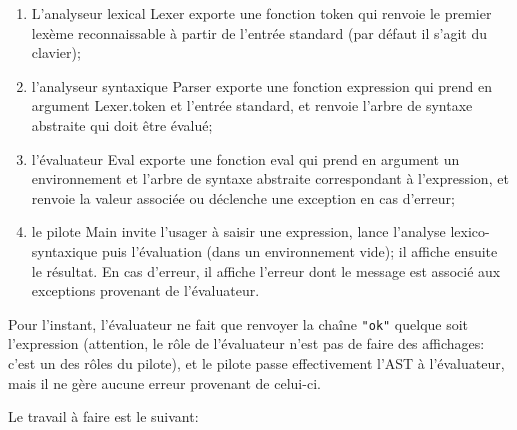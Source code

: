 \documentclass[a4paper,11pt]{article}
\begin{document}
\begin{enumerate}

  \item L'analyseur lexical \textsf{Lexer} exporte une fonction
    \textsf{token} qui renvoie le premier lexème reconnaissable à
    partir de l'entrée standard (par défaut il s'agit du clavier);

  \item l'analyseur syntaxique \textsf{Parser} exporte une fonction
    \textsf{expression} qui prend en argument \textsf{Lexer.token} et
    l'entrée standard, et renvoie l'arbre de syntaxe abstraite qui
    doit être évalué;

  \item l'évaluateur \textsf{Eval} exporte une fonction \textsf{eval}
    qui prend en argument un environnement et l'arbre de syntaxe
    abstraite correspondant à l'expression, et renvoie la valeur
    associée ou déclenche une exception en cas d'erreur;

  \item le pilote \textsf{Main} invite l'usager à saisir une
    expression, lance l'analyse lexico-syntaxique puis l'évaluation
    (dans un environnement vide); il affiche ensuite le résultat. En
    cas d'erreur, il affiche l'erreur dont le message est associé aux
    exceptions provenant de l'évaluateur.

\end{enumerate}

\noindent Pour l'instant, l'évaluateur ne fait que renvoyer la chaîne
\texttt{"ok"} quelque soit l'expression (attention, le rôle de
l'évaluateur n'est pas de faire des affichages: c'est un des rôles du
pilote), et le pilote passe effectivement l'AST à l'évaluateur, mais
il ne gère aucune erreur provenant de celui-ci.

\noindent Le travail à faire est le suivant:


\end{document}
